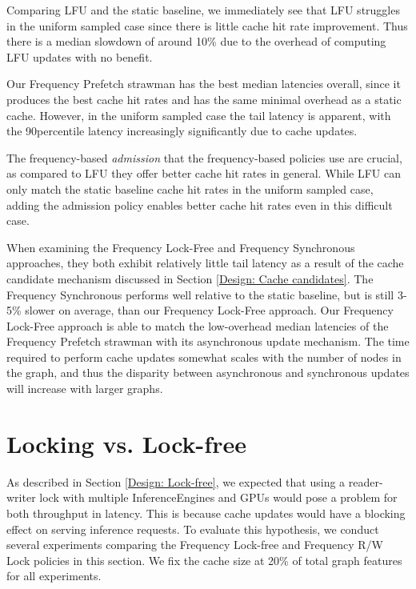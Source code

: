 Comparing LFU and the static baseline, we immediately see that LFU struggles in the uniform sampled case since there is little cache hit rate improvement. Thus there is a median slowdown of around 10\% due to the overhead of computing LFU updates with no benefit. 

Our Frequency Prefetch strawman has the best median latencies overall, since it produces the best cache hit rates and has the same minimal overhead as a static cache. However, in the uniform sampled case the tail latency is apparent, with the 90\th percentile latency increasingly significantly due to cache updates.

The frequency-based \textit{admission} that the frequency-based policies use are crucial, as compared to LFU they offer better cache hit rates in general. While LFU can only match the static baseline cache hit rates in the uniform sampled case, adding the admission policy enables better cache hit rates even in this difficult case. 

When examining the Frequency Lock-Free and Frequency Synchronous approaches, they both exhibit relatively little tail latency as a result of the cache candidate mechanism discussed in Section \ref{Design: Cache candidates}. The Frequency Synchronous performs well relative to the static baseline, but is still 3-5\% slower on average, than our Frequency Lock-Free approach. Our Frequency Lock-Free approach is able to match the low-overhead median latencies of the Frequency Prefetch strawman with its asynchronous update mechanism. The time required to perform cache updates somewhat scales with the number of nodes in the graph, and thus the disparity between asynchronous and synchronous updates will increase with larger graphs.

\section{Locking vs. Lock-free}

As described in Section \ref{Design: Lock-free}, we expected that using a reader-writer lock with multiple InferenceEngines and GPUs would pose a problem for both throughput in latency. This is because cache updates would have a blocking effect on serving inference requests. To evaluate this hypothesis, we conduct several experiments comparing the Frequency Lock-free and Frequency R/W Lock policies in this section. We fix the cache size at 20\% of total graph features for all experiments.


